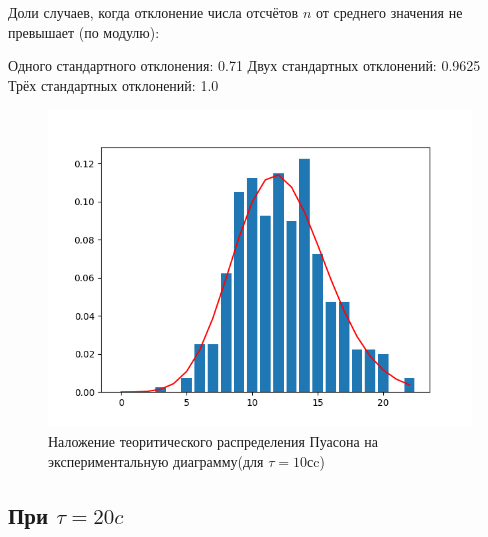\documentclass[a4paper, 12pt]{article}
\begin{document}
Доли случаев, когда отклонение числа отсчётов $n$ от среднего значения не превышает (по модулю):

Одного стандартного отклонения: 0.71
Двух стандартных отклонений: 0.9625
Трёх стандартных отклонений: 1.0

\begin{figure}[h!]
    \centering
    \includegraphics[width=1\textwidth]{10.png}
    \caption{Наложение теоритического распределения Пуасона на экспериментальную диаграмму(для $\tau = 10с$c)}
    \label{fig:my_label}
\end{figure}



\clearpage

\subsection*{При $\tau=20 c$}
\end{document}
